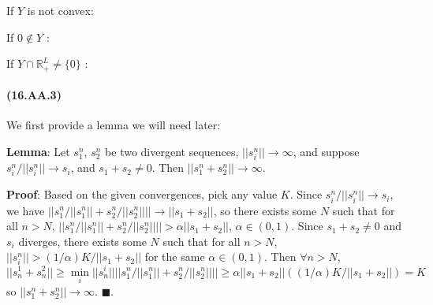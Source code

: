 \documentclass[10pt,letter]{article}
\begin{document}


If $Y$ is not convex:


If $0 \not \in Y$ :


If $Y \cap \mathbb{R}^L_+ \neq \{ 0 \}$  :

\paragraph{(16.AA.3)}
We first provide a lemma we will need later:

\textbf{Lemma}: Let $s_1^n$, $s_2^n$ be two divergent sequences, $||s_i^n|| \to \infty$, and suppose $s_i^n /||s_i^n|| \to s_i$, and $s_1 + s_2 \neq 0$. Then $||s_1^n + s_2^n|| \to \infty$.

\textbf{Proof}: Based on the given convergences, pick any value $K$. Since $s_i^n /||s_i^n|| \to s_i$, we have $|| s_1^n /||s_1^n|| + s_2^n /||s_2^n|| || \to ||s_1 + s_2||$, so there exists some $N$ such that for all $n > N$, $|| s_1^n /||s_1^n|| + s_2^n /||s_2^n|| || > \alpha || s_1 + s_2||$, $\alpha \in (0,1)$.
Since $s_1 + s_2 \neq 0$ and $s_i$ diverges, there exists some $N$ such that for all $n > N$, $||s_i^n|| > (1/\alpha) K / ||s_1 + s_2 ||$ for the same $\alpha \in (0,1)$.
Then $\forall n > N$, \[ || s^1_n + s^2_n|| \ge \min_i ||s^i_n|| || s_1^n /||s_1^n|| + s_2^n /||s_2^n|| || \ge \alpha || s_1 + s_2|| \left((1/\alpha) K / ||s_1 + s_2 || \right) = K\]
so $||s_1^n + s_2^n|| \to \infty$. $\blacksquare$.
\end{document}
